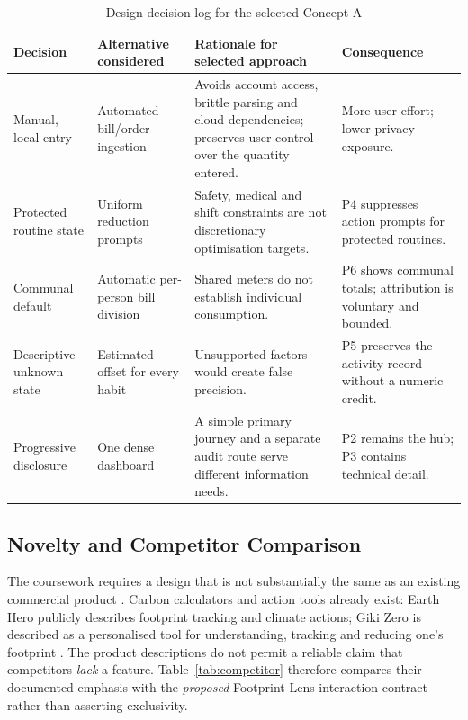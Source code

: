 \documentclass[12pt,a4paper]{article}
\begin{document}
\begin{table}[ht]
\centering
\small
\caption{Design decision log for the selected Concept A}
\label{tab:decision-log}
\begin{tabularx}{\textwidth}{@{}>{\raggedright\arraybackslash}p{2.45cm}>{\raggedright\arraybackslash}p{3.0cm}>{\raggedright\arraybackslash}X>{\raggedright\arraybackslash}p{2.5cm}@{}}
\toprule
\textbf{Decision} & \textbf{Alternative considered} & \textbf{Rationale for selected approach} & \textbf{Consequence}\\
\midrule
Manual, local entry & Automated bill/order ingestion & Avoids account access, brittle parsing and cloud dependencies; preserves user control over the quantity entered. & More user effort; lower privacy exposure.\\
\rowcolor{brandlight}
Protected routine state & Uniform reduction prompts & Safety, medical and shift constraints are not discretionary optimisation targets. & P4 suppresses action prompts for protected routines.\\
Communal default & Automatic per-person bill division & Shared meters do not establish individual consumption. & P6 shows communal totals; attribution is voluntary and bounded.\\
\rowcolor{brandlight}
Descriptive unknown state & Estimated offset for every habit & Unsupported factors would create false precision. & P5 preserves the activity record without a numeric credit.\\
Progressive disclosure & One dense dashboard & A simple primary journey and a separate audit route serve different information needs. & P2 remains the hub; P3 contains technical detail.\\
\bottomrule
\end{tabularx}
\end{table}

\subsection{Novelty and Competitor Comparison}
The coursework requires a design that is not substantially the same as an existing commercial product \cite{modulebrief}. Carbon calculators and action tools already exist: Earth Hero publicly describes footprint tracking and climate actions; Giki Zero is described as a personalised tool for understanding, tracking and reducing one's footprint \cite{earthhero,gikizero}. The product descriptions do not permit a reliable claim that competitors \emph{lack} a feature. Table~\ref{tab:competitor} therefore compares their documented emphasis with the \emph{proposed} Footprint Lens interaction contract rather than asserting exclusivity.
\end{document}
